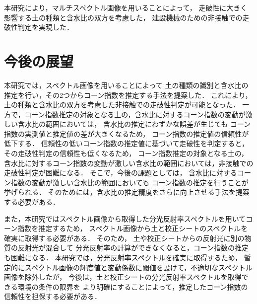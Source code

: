 本研究により，マルチスペクトル画像を用いることによって，
走破性に大きく影響する土の種類と含水比の双方を考慮した，
建設機械のための非接触での走破性判定を実現した．

\newpage


\section{今後の展望}

本研究では，スペクトル画像を用いることによって
土の種類の識別と含水比の推定を行い，その2つからコーン指数を推定する手法を提案した．
これにより，土の種類と含水比の双方を考慮した非接触での走破性判定が可能となった．
一方で，コーン指数推定の対象となる土の，含水比に対するコーン指数の変動が激しい含水比の範囲においては，
含水比の推定にわずかな誤差が生じても
コーン指数の実測値と推定値の差が大きくなるため，
コーン指数の推定値の信頼性が低下する．
信頼性の低いコーン指数の推定値に基づいて走破性を判定すると，その走破性判定の信頼性も低くなるため，
コーン指数推定の対象となる土の，含水比に対するコーン指数の変動が激しい含水比の範囲においては，非接触での走破性判定が困難になる．
そこで，今後の課題としては，
含水比に対するコーン指数の変動が激しい含水比の範囲においても
コーン指数の推定を行うことが挙げられる．
そのためには，含水比の推定精度をさらに向上させる手法を提案する必要がある．

また，本研究ではスペクトル画像から取得した分光反射率スペクトルを用いてコーン指数を推定するため，
スペクトル画像から土と校正シートのスペクトルを確実に取得する必要がある．
そのため，
土や校正シートからの反射光に別の物質の反射光が混合して
分光反射率の計算ができなくなると，コーン指数の推定も困難になる．
本研究では，分光反射率スペクトルを確実に取得するため，
暫定的にスペクトル画像の輝度値と変動係数に閾値を設けて，不適切なスペクトル画像を除外したが，
今後は，土と校正シートの分光反射率スペクトルを取得できる環境の条件の限界を
より明確にすることによって，推定したコーン指数の信頼性を担保する必要がある．


